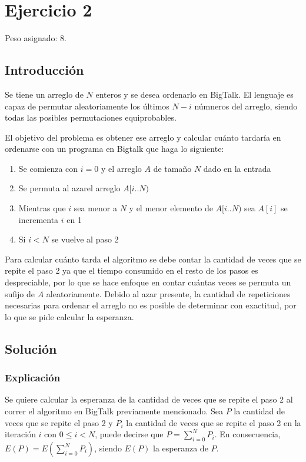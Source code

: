 \section{Ejercicio 2}

Peso asignado: 8.

\subsection{Introducción}

Se tiene un arreglo de $N$ enteros y se desea ordenarlo en BigTalk. El
lenguaje es capaz de permutar aleatoriamente los últimos $N - i$ númneros del
arreglo, siendo todas las posibles permutaciones equiprobables.

El objetivo del problema es obtener ese arreglo y calcular cuánto tardaría en
ordenarse con un programa en Bigtalk que haga lo siguiente:

\begin{enumerate}
\item Se comienza con $i = 0$ y el arreglo $A$ de tamaño $N$ dado en la
entrada
\item Se permuta al azarel arreglo $A[i..N)$
\item Mientras que $i$ sea menor a $N$ y el menor elemento de $A[i..N)$ sea
$A[i]$ se incrementa $i$ en 1
\item Si $i < N$ se vuelve al paso 2
\end{enumerate}

Para calcular cuánto tarda el algoritmo se debe contar la cantidad de veces
que se repite el paso 2 ya que el tiempo consumido en el resto de los pasos es
despreciable, por lo que se hace enfoque en contar cuántas veces se permuta un
sufijo de $A$ aleatoriamente. Debido al azar presente, la cantidad de
repeticiones necesarias para ordenar el arreglo no es posible de determinar
con exactitud, por lo que se pide calcular la esperanza.

\subsection{Solución}

\subsubsection{Explicación}

Se quiere calcular la esperanza de la cantidad de veces que se repite el paso
2 al correr el algoritmo en BigTalk previamente mencionado. Sea $P$ la
cantidad de veces que se repite el paso 2 y $P_i$ la cantidad de veces que se
repite el paso 2 en la iteración $i$ con $0 \leq i < N$, puede decirse que
$P = \sum_{i = 0}^{N}{P_i}$. En consecuencia,
$E(P) = E(\sum_{i = 0}^{N}{P_i})$, siendo $E(P)$ la esperanza de $P$.

